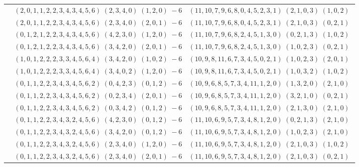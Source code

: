 \documentclass[11pt]{article}
\begin{document}
\begin{longtable}[l]{|c|c|c|}
 \cline{2-3} 
 & $(2 ,0 ,1 ,1 ,2 ,2 ,3 ,4 ,3 ,4 ,5 ,6) \;(2 ,3 ,4 ,0) \;(1 ,2 ,0) \;-6$ & $(11 ,10 ,7 ,9 ,6 ,8 ,0 ,4 ,5 ,2 ,3 ,1) \;(2 ,1 ,0 ,3) \;(1 ,0 ,2) \;$\\ 
 \cline{2-3} 
 & $(2 ,0 ,1 ,1 ,2 ,2 ,3 ,4 ,3 ,4 ,5 ,6) \;(2 ,3 ,4 ,0) \;(2 ,0 ,1) \;-6$ & $(11 ,10 ,7 ,9 ,6 ,8 ,0 ,4 ,5 ,2 ,3 ,1) \;(2 ,1 ,0 ,3) \;(0 ,2 ,1) \;$\\ 
 \cline{2-3} 
 & $(0 ,1 ,2 ,1 ,2 ,2 ,3 ,4 ,3 ,4 ,5 ,6) \;(4 ,2 ,3 ,0) \;(1 ,2 ,0) \;-6$ & $(11 ,10 ,7 ,9 ,6 ,8 ,2 ,4 ,5 ,1 ,3 ,0) \;(0 ,2 ,1 ,3) \;(1 ,0 ,2) \;$\\ 
 \cline{2-3} 
 & $(0 ,1 ,2 ,1 ,2 ,2 ,3 ,4 ,3 ,4 ,5 ,6) \;(3 ,4 ,2 ,0) \;(2 ,0 ,1) \;-6$ & $(11 ,10 ,7 ,9 ,6 ,8 ,2 ,4 ,5 ,1 ,3 ,0) \;(1 ,0 ,2 ,3) \;(0 ,2 ,1) \;$\\ 
 \cline{2-3} 
 & $(1 ,0 ,1 ,2 ,2 ,2 ,3 ,3 ,4 ,5 ,6 ,4) \;(3 ,4 ,2 ,0) \;(1 ,0 ,2) \;-6$ & $(10 ,9 ,8 ,11 ,6 ,7 ,3 ,4 ,5 ,0 ,2 ,1) \;(1 ,0 ,2 ,3) \;(2 ,0 ,1) \;$\\ 
 \cline{2-3} 
 & $(1 ,0 ,1 ,2 ,2 ,2 ,3 ,3 ,4 ,5 ,6 ,4) \;(3 ,4 ,0 ,2) \;(1 ,2 ,0) \;-6$ & $(10 ,9 ,8 ,11 ,6 ,7 ,3 ,4 ,5 ,0 ,2 ,1) \;(1 ,0 ,3 ,2) \;(1 ,0 ,2) \;$\\ 
 \cline{2-3} 
 & $(0 ,1 ,1 ,2 ,2 ,3 ,4 ,3 ,4 ,5 ,6 ,2) \;(0 ,4 ,2 ,3) \;(0 ,1 ,2) \;-6$ & $(10 ,9 ,6 ,8 ,5 ,7 ,3 ,4 ,11 ,1 ,2 ,0) \;(1 ,3 ,2 ,0) \;(2 ,1 ,0) \;$\\ 
 \cline{2-3} 
 & $(0 ,1 ,1 ,2 ,2 ,3 ,4 ,3 ,4 ,5 ,6 ,2) \;(0 ,2 ,3 ,4) \;(2 ,0 ,1) \;-6$ & $(10 ,9 ,6 ,8 ,5 ,7 ,3 ,4 ,11 ,1 ,2 ,0) \;(3 ,2 ,1 ,0) \;(0 ,2 ,1) \;$\\ 
 \cline{2-3} 
 & $(0 ,1 ,1 ,2 ,2 ,3 ,4 ,3 ,4 ,5 ,6 ,2) \;(0 ,3 ,4 ,2) \;(0 ,1 ,2) \;-6$ & $(10 ,9 ,6 ,8 ,5 ,7 ,3 ,4 ,11 ,1 ,2 ,0) \;(2 ,1 ,3 ,0) \;(2 ,1 ,0) \;$\\ 
 \cline{2-3} 
 & $(0 ,1 ,1 ,2 ,2 ,3 ,4 ,3 ,2 ,4 ,5 ,6) \;(4 ,2 ,3 ,0) \;(0 ,1 ,2) \;-6$ & $(11 ,10 ,6 ,9 ,5 ,7 ,3 ,4 ,8 ,1 ,2 ,0) \;(0 ,2 ,1 ,3) \;(2 ,1 ,0) \;$\\ 
 \cline{2-3} 
 & $(0 ,1 ,1 ,2 ,2 ,3 ,4 ,3 ,2 ,4 ,5 ,6) \;(3 ,4 ,2 ,0) \;(0 ,1 ,2) \;-6$ & $(11 ,10 ,6 ,9 ,5 ,7 ,3 ,4 ,8 ,1 ,2 ,0) \;(1 ,0 ,2 ,3) \;(2 ,1 ,0) \;$\\ 
 \cline{2-3} 
 & $(0 ,1 ,1 ,2 ,2 ,3 ,4 ,3 ,2 ,4 ,5 ,6) \;(2 ,3 ,4 ,0) \;(1 ,2 ,0) \;-6$ & $(11 ,10 ,6 ,9 ,5 ,7 ,3 ,4 ,8 ,1 ,2 ,0) \;(2 ,1 ,0 ,3) \;(1 ,0 ,2) \;$\\ 
 \cline{2-3} 
 & $(0 ,1 ,1 ,2 ,2 ,3 ,4 ,3 ,2 ,4 ,5 ,6) \;(2 ,3 ,4 ,0) \;(2 ,0 ,1) \;-6$ & $(11 ,10 ,6 ,9 ,5 ,7 ,3 ,4 ,8 ,1 ,2 ,0) \;(2 ,1 ,0 ,3) \;(0 ,2 ,1) \;$\\ 

\end{longtable}
\end{document}
